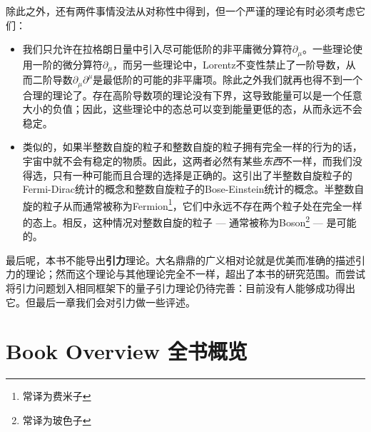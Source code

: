 除此之外，还有两件事情没法从对称性中得到，但一个严谨的理论有时必须考虑它们：

\begin{itemize}
\item 我们只允许在拉格朗日量中引入尽可能低阶的非平庸微分算符$\partial_\mu$。一些理论使用一阶的微分算符$\partial_\mu$，而另一些理论中，Lorentz不变性禁止了一阶导数，从而二阶导数$\partial_\mu\partial^\mu$是最低阶的可能的非平庸项。除此之外我们就再也得不到一个合理的理论了。存在高阶导数项的理论没有下界，这导致能量可以是一个任意大小的负值；因此，这些理论中的态总可以变到能量更低的态，从而永远不会稳定。
\item 类似的，如果半整数自旋的粒子和整数自旋的粒子拥有完全一样的行为的话，宇宙中就不会有稳定的物质。因此，这两者必然有某些{\it 东西}不一样，而我们没得选，只有一种可能而且合理的选择是正确的。这引出了半整数自旋粒子的Fermi-Dirac统计的概念和整数自旋粒子的Bose-Einstein统计的概念。半整数自旋的粒子从而通常被称为Fermion\footnote{常译为费米子}，它们中永远不存在两个粒子处在完全一样的态上。相反，这种情况对整数自旋的粒子 --- 通常被称为Boson\footnote{常译为玻色子} --- 是可能的。
\end{itemize}

最后呢，本书不能导出{\bf 引力}理论。大名鼎鼎的广义相对论就是优美而准确的描述引力的理论；然而这个理论与其他理论完全不一样，超出了本书的研究范围。而尝试将引力问题划入相同框架下的量子引力理论仍待完善：目前没有人能够成功得出它。但最后一章我们会对引力做一些评述。

\section[全书概览]{Book Overview 全书概览}\label{sec1.2}

\begin{center}
\end{center}

